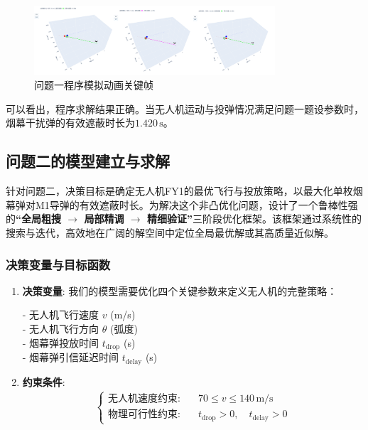\documentclass[12pt]{article}
\begin{document}
\begin{CJK}{UTF8}{gbsn}
		\begin{figure}[H]
			\centering
			\includegraphics[width=0.8\textwidth]{pic/Fg3.png}
			\caption{问题一程序模拟动画关键帧}
			\label{fig:simulation_q1}
		\end{figure}
		
		可以看出，程序求解结果正确。当无人机运动与投弹情况满足问题一题设参数时，烟幕干扰弹的有效遮蔽时长为$1.420\,\mathrm{s}$。
		
		
		\subsection{问题二的模型建立与求解}
		
		针对问题二，决策目标是确定无人机FY1的最优飞行与投放策略，以最大化单枚烟幕弹对M1导弹的有效遮蔽时长。为解决这个非凸优化问题，设计了一个鲁棒性强的\textbf{“全局粗搜 $\rightarrow$ 局部精调 $\rightarrow$ 精细验证”}三阶段优化框架。该框架通过系统性的搜索与迭代，高效地在广阔的解空间中定位全局最优解或其高质量近似解。
		
		\subsubsection{决策变量与目标函数}
		
		\begin{enumerate}
			\item \textbf{决策变量}: 我们的模型需要优化四个关键参数来定义无人机的完整策略：
			
			- 无人机飞行速度 $v$ (m/s)\\
			\indent	- 无人机飞行方向 $\theta$ (弧度)\\
			\indent	- 烟幕弹投放时间 $t_{\text{drop}}$ (s)\\
			\indent	- 烟幕弹引信延迟时间 $t_{\text{delay}}$ (s)
			
			\item \textbf{约束条件}:
			\begin{align}
				\left\{
				\begin{aligned}
					\text{无人机速度约束:} &\quad 70 \le v \le 140\,\text{m/s} \\
					\text{物理可行性约束:} &\quad t_{\text{drop}} > 0,\quad t_{\text{delay}} > 0
				\end{aligned}
				\right.
			\end{align}
			

\end{enumerate}
\end{CJK}
\end{document}
